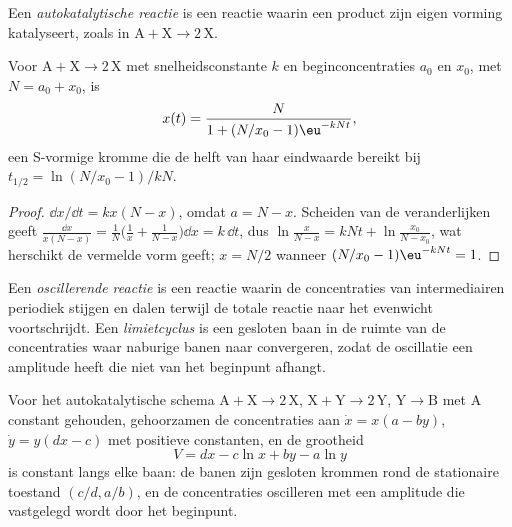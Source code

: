 \begin{definition}\label{def:b3:complex-kinetics:autocatalysis}
Een \emph{autokatalytische reactie} is een
reactie waarin een product zijn eigen vorming katalyseert, zoals in $\mathrm{A + X \to 2\,X}$.
\end{definition}

\begin{proposition}\label{prop:b3:complex-kinetics:logistic}
Voor $\mathrm{A + X \to 2\,X}$ met snelheidsconstante $k$ en
beginconcentraties $a_0$ en $x_0$, met $N = a_0 + x_0$, is
\[
  x(t) = \frac{N}{1 + (N/x_0 - 1)\eu^{-kNt}},
\]
een S-vormige kromme die de helft van haar eindwaarde bereikt bij $t_{1/2} = \ln(N/x_0 - 1)/kN$.
\end{proposition}

\begin{proof}
$\dd x/\dd t = kx(N - x)$, omdat $a = N - x$. Scheiden van de
veranderlijken geeft $\frac{\dd x}{x(N - x)} = \frac1N\bigl(\frac1x + \frac{1}{N - x}\bigr)\dd x
= k\,\dd t$, dus $\ln\frac{x}{N - x} = kNt + \ln\frac{x_0}{N - x_0}$, wat
herschikt de vermelde vorm geeft;
$x = N/2$ wanneer $(N/x_0 - 1)\eu^{-kNt} = 1$.
\end{proof}

\begin{definition}\label{def:b3:complex-kinetics:oscillating}
Een \emph{oscillerende reactie} is een reactie
waarin de concentraties van intermediairen periodiek stijgen en dalen
terwijl de totale reactie naar het evenwicht voortschrijdt. Een
\emph{limietcyclus} is een gesloten baan in de ruimte
van de concentraties waar naburige banen naar convergeren, zodat de
oscillatie een amplitude heeft die niet van het beginpunt afhangt.
\end{definition}

\begin{theorem}\label{thm:b3:complex-kinetics:lotka-volterra}
Voor het autokatalytische schema $\mathrm{A + X \to 2\,X}$, $\mathrm{X + Y \to 2\,Y}$, $\mathrm{Y \to B}$ met A
constant gehouden, gehoorzamen de concentraties aan $\dot x = x(a - by)$, $\dot y = y(dx - c)$ met
positieve constanten, en de grootheid
\[
  V = dx - c\ln x + by - a\ln y
\]
is constant langs elke baan: de banen zijn gesloten krommen rond de
stationaire toestand $(c/d, a/b)$, en de concentraties oscilleren met een
amplitude die vastgelegd wordt door het beginpunt.
\end{theorem}

